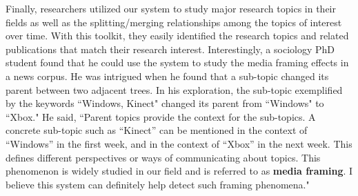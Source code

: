 Finally, researchers utilized our system to study major research topics in their fields as well as the splitting/merging relationships among the topics of interest over time.
With this toolkit, they easily identified the research topics and related publications that match their research interest.
Interestingly, a sociology PhD student found that he could use the system to study the media framing effects in a news corpus.
He was intrigued when he found that a sub-topic changed its parent between two adjacent trees.
In his exploration, the sub-topic exemplified by the keywords ``Windows, Kinect" changed its parent from ``Windows" to ``Xbox."
He said, ``Parent topics provide the context for the sub-topics.
A concrete sub-topic such as ``Kinect'' can be mentioned in the context of ``Windows'' in the first week, and in the context of ``Xbox'' in the next week.
This defines different perspectives or ways of communicating about topics.
This phenomenon is widely studied in our field and is referred to as \textbf{media framing}.
I believe this system can definitely help detect such framing phenomena." 